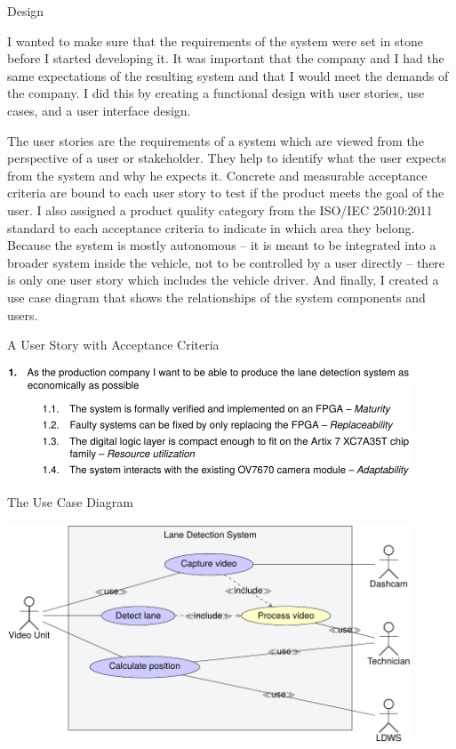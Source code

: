\documentclass{matthijs}
\begin{document}
	\begin{hoofdstuk}{Design}

		\setlength\parindent{1.5em}
		\setlength{\parskip}{0.5em plus 0.2em minus 0.1em}
		\linespread{1.2}
		\vspace{-1ex}

		I wanted to make sure that the requirements of the system were set in stone before I started developing it.
		It was important that the company and I had the same expectations of the resulting system and that I would meet the demands of the company.
		I did this by creating a functional design with user stories, use cases, and a user interface design.
		
		The user stories are the requirements of a system which are viewed from the perspective of a user or stakeholder.
		They help to identify what the user expects from the system and why he expects it.
		Concrete and measurable acceptance criteria are bound to each user story to test if the product meets the goal of the user.
		I also assigned a product quality category from the ISO/IEC 25010:2011 standard \cite{iso25010systems} to each acceptance criteria to indicate in which area they belong.
		Because the system is mostly autonomous -- it is meant to be integrated into a broader system inside the vehicle, not to be controlled by a user directly -- there is only one user story which includes the vehicle driver.
		And finally, I created a use case diagram that shows the relationships of the system components and users.

		\begin{figuur}{A User Story with Acceptance Criteria}
			\vspace{2ex}
			\centerline{
				\includegraphics[width=0.9\textwidth]{user-stories-crop.pdf}
				\hspace{3ex}
			}
		\end{figuur}

		\begin{figuur}{The Use Case Diagram}
			\vspace{1ex}
			\centerline{
				\includegraphics[width=0.9\textwidth]{use-cases-crop.pdf}
				\hspace{1.5ex}
			}
		\end{figuur}


\end{hoofdstuk}
\end{document}
